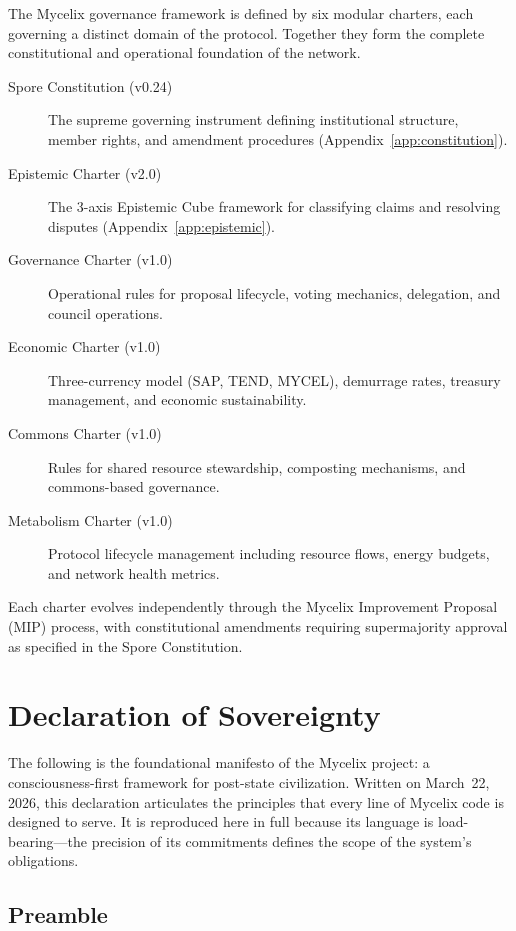 \documentclass[12pt]{book}
\begin{document}
The Mycelix governance framework is defined by six modular charters, each
governing a distinct domain of the protocol. Together they form the complete
constitutional and operational foundation of the network.

\begin{description}
  \item[Spore Constitution (v0.24)] The supreme governing instrument defining
    institutional structure, member rights, and amendment procedures
    (Appendix~\ref{app:constitution}).
  \item[Epistemic Charter (v2.0)] The 3-axis Epistemic Cube framework for
    classifying claims and resolving disputes (Appendix~\ref{app:epistemic}).
  \item[Governance Charter (v1.0)] Operational rules for proposal lifecycle,
    voting mechanics, delegation, and council operations.
  \item[Economic Charter (v1.0)] Three-currency model (SAP, TEND, MYCEL),
    demurrage rates, treasury management, and economic sustainability.
  \item[Commons Charter (v1.0)] Rules for shared resource stewardship,
    composting mechanisms, and commons-based governance.
  \item[Metabolism Charter (v1.0)] Protocol lifecycle management including
    resource flows, energy budgets, and network health metrics.
\end{description}

Each charter evolves independently through the Mycelix Improvement Proposal
(MIP) process, with constitutional amendments requiring supermajority approval
as specified in the Spore Constitution.


\chapter{Declaration of Sovereignty}
\label{app:declaration}

The following is the foundational manifesto of the Mycelix project: a
consciousness-first framework for post-state civilization. Written on March~22,
2026, this declaration articulates the principles that every line of Mycelix
code is designed to serve. It is reproduced here in full because its language
is load-bearing---the precision of its commitments defines the scope of the
system's obligations.

\section*{Preamble}
\end{document}
